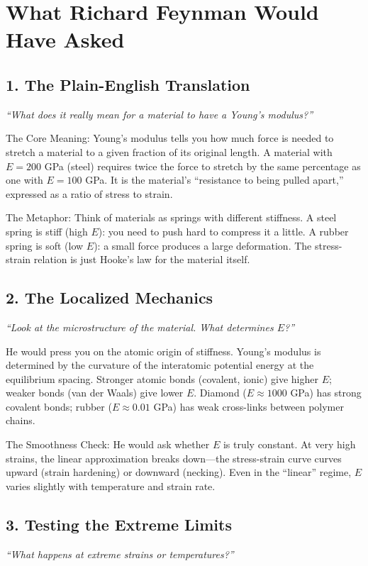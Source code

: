 \section*{What Richard Feynman Would Have Asked}

\subsection*{1. The Plain-English Translation}
\textit{``What does it really mean for a material to have a Young's modulus?''}

The Core Meaning: Young's modulus tells you how much force is needed to stretch a material to a given fraction of its original length. A material with $E = 200$ GPa (steel) requires twice the force to stretch by the same percentage as one with $E = 100$ GPa. It is the material's ``resistance to being pulled apart,'' expressed as a ratio of stress to strain.

The Metaphor: Think of materials as springs with different stiffness. A steel spring is stiff (high $E$): you need to push hard to compress it a little. A rubber spring is soft (low $E$): a small force produces a large deformation. The stress-strain relation is just Hooke's law for the material itself.

\subsection*{2. The Localized Mechanics}
\textit{``Look at the microstructure of the material. What determines $E$?''}

He would press you on the atomic origin of stiffness. Young's modulus is determined by the curvature of the interatomic potential energy at the equilibrium spacing. Stronger atomic bonds (covalent, ionic) give higher $E$; weaker bonds (van der Waals) give lower $E$. Diamond ($E \approx 1000$ GPa) has strong covalent bonds; rubber ($E \approx 0.01$ GPa) has weak cross-links between polymer chains.

The Smoothness Check: He would ask whether $E$ is truly constant. At very high strains, the linear approximation breaks down---the stress-strain curve curves upward (strain hardening) or downward (necking). Even in the ``linear'' regime, $E$ varies slightly with temperature and strain rate.

\subsection*{3. Testing the Extreme Limits}
\textit{``What happens at extreme strains or temperatures?''}

